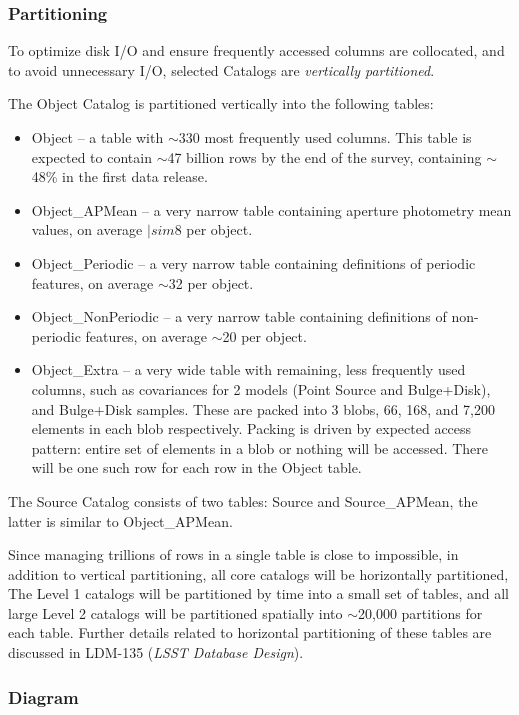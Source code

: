 \documentclass[DM,toc]{lsstdoc}
\begin{document}
\subsubsection{Partitioning}

To optimize disk I/O and ensure frequently accessed columns are collocated, and to avoid unnecessary I/O, selected Catalogs are \textit{vertically partitioned}.

The Object Catalog is partitioned vertically into the following tables: 

\begin{itemize}
  \item Object – a table with $\sim$330 most frequently used columns. This table is expected to contain $\sim$47 billion rows by the end of the survey, containing $\sim$48\% in the first data release.
  \item Object\_APMean – a very narrow table containing aperture photometry mean values, on average $|sim$8 per object.
  \item Object\_Periodic – a very narrow table containing definitions of periodic features, on average $\sim$32 per object.
  \item Object\_NonPeriodic – a very narrow table containing definitions of non-periodic features, on average $\sim$20 per object.
  \item Object\_Extra – a very wide table with remaining, less frequently used columns, such as covariances for 2 models (Point Source and Bulge+Disk), and Bulge+Disk samples. These are packed into 3 blobs, 66, 168, and 7,200 elements in each blob respectively. Packing is driven by expected access pattern: entire set of elements in a blob or nothing will be accessed. There will be one such row for each row in the Object table.  
\end{itemize}

The Source Catalog consists of two tables: Source and Source\_APMean, the latter is similar to Object\_APMean.

Since managing trillions of rows in a single table is close to impossible, in addition to vertical partitioning, all core catalogs will be horizontally partitioned, The Level 1 catalogs will be partitioned by time into a small set of tables, and all large Level 2 catalogs will be partitioned spatially into $\sim$20,000 partitions for each table. Further details related to horizontal partitioning of these tables are discussed in LDM-135 (\textit{LSST Database Design}).

\subsubsection{Diagram}
\end{document}
